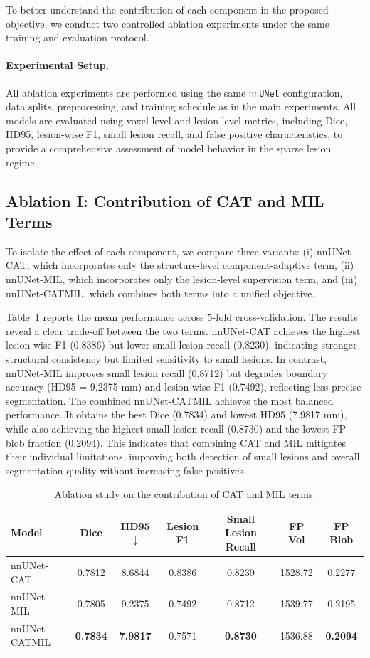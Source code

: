 To better understand the contribution of each component in the proposed
objective, we conduct two controlled ablation experiments under the same
training and evaluation protocol.

\paragraph{Experimental Setup.}
All ablation experiments are performed using the same \texttt{nnUNet}
configuration, data splits, preprocessing, and training schedule as in
the main experiments. All models are evaluated using voxel-level and lesion-level metrics,
including Dice, HD95, lesion-wise F1, small lesion recall, and false
positive characteristics, to provide a comprehensive assessment of model
behavior in the sparse lesion regime.

\subsection*{Ablation I: Contribution of CAT and MIL Terms}

To isolate the effect of each component, we compare three variants:
(i) nnUNet-CAT, which incorporates only the structure-level
component-adaptive term,
(ii) nnUNet-MIL, which incorporates only the lesion-level supervision
term, and
(iii) nnUNet-CATMIL, which combines both terms into a unified objective.

Table~\ref{tab:ablation_cat_mil} reports the mean performance across
5-fold cross-validation. The results reveal a clear trade-off between the
two terms. nnUNet-CAT achieves the highest lesion-wise F1 (0.8386) but
lower small lesion recall (0.8230), indicating stronger structural
consistency but limited sensitivity to small lesions. In contrast,
nnUNet-MIL improves small lesion recall (0.8712) but degrades boundary
accuracy (HD95 = 9.2375 mm) and lesion-wise F1 (0.7492), reflecting less
precise segmentation. The combined nnUNet-CATMIL achieves the most balanced performance. It
obtains the best Dice (0.7834) and lowest HD95 (7.9817 mm), while also
achieving the highest small lesion recall (0.8730) and the lowest FP blob
fraction (0.2094). This indicates that combining CAT and MIL mitigates
their individual limitations, improving both detection of small lesions
and overall segmentation quality without increasing false positives.

\begin{table}[H]
\centering
\caption{Ablation study on the contribution of CAT and MIL terms.}
\label{tab:ablation_cat_mil}
\begin{tabular}{lcccccc}
\hline
Model & Dice & HD95 $\downarrow$ & Lesion F1 & Small Lesion Recall & FP Vol & FP Blob \\
\hline
nnUNet-CAT    & 0.7812 & 8.6844 & 0.8386 & 0.8230 & 1528.72 & 0.2277 \\
nnUNet-MIL    & 0.7805 & 9.2375 & 0.7492 & 0.8712 & 1539.77 & 0.2195 \\
nnUNet-CATMIL & \textbf{0.7834} & \textbf{7.9817} & 0.7571 & \textbf{0.8730} & 1536.88 & \textbf{0.2094} \\
\hline
\end{tabular}
\end{table}

